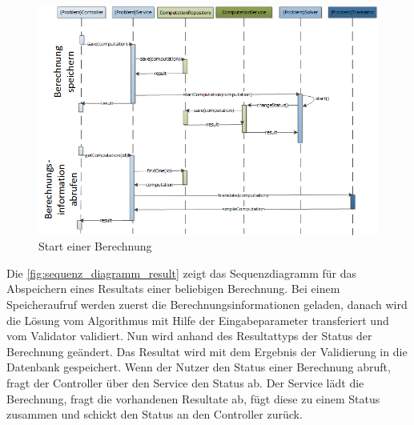 \begin{figure}[h]
\centering
\includegraphics[scale=0.74]{images/visio/sequenz_diagramm_start.png}
\caption[Start einer Berechnung]{Start einer Berechnung \selfmade{}}
\label{fig:sequenz_diagramm_start}
\end{figure}

\newpage

Die \autoref{fig:sequenz_diagramm_result} zeigt das Sequenzdiagramm für das Abspeichern eines Resultats einer beliebigen Berechnung. Bei einem Speicheraufruf werden zuerst die 
Berechnungsinformationen geladen, danach wird die Lösung vom Algorithmus mit Hilfe der Eingabeparameter transferiert und vom Validator validiert. Nun wird anhand des Resultattyps der 
Status der Berechnung geändert. Das Resultat wird mit dem Ergebnis der Validierung in die Datenbank gespeichert. Wenn der Nutzer den Status einer Berechnung abruft, fragt der Controller 
über den Service den Status ab. Der Service lädt die Berechnung, fragt die vorhandenen Resultate ab, fügt diese zu einem Status zusammen und schickt den Status an den Controller zurück.

